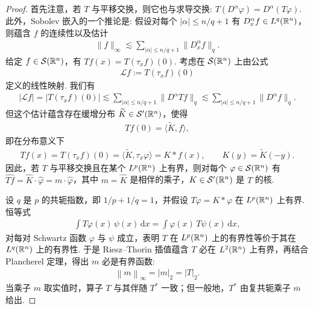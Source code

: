 \begin{proof}
首先注意，若 $T$ 与平移交换，则它也与求导交换: $T(D^\alpha \varphi) = D^\alpha(T \varphi)$. 此外，Sobolev 嵌入的一个推论是: 假设对每个 $|\alpha| \leq n/q + 1$ 有 $D_x^\alpha f \in L^q(\mathbb{R}^n)$，则蕴含 $f$ 的连续性以及估计
\begin{align*}
  \|f\|_{\infty}\lesssim\sum_{|\alpha|\leq n/q+1}\|D_{x}^{\alpha}f\|_{q}.
\end{align*}
给定 $f \in \mathcal{S}(\mathbb{R}^n)$，有 $Tf(x) = T(\tau_x f)(0)$. 考虑在 $\mathcal{S}(\mathbb{R}^n)$ 上由公式
\begin{align*}
  \mathcal{L}f:=T(\tau_{x}f)(0)
\end{align*}
定义的线性映射. 我们有
\begin{align*}
  |\mathcal{L}f|=|T(\tau_{x}f)(0)|\lesssim\sum_{|\alpha|\leq n/q+1}\|D^{\alpha}T f\|_{q}
  \lesssim\sum_{|\alpha|\leq n/q+1}\|D^{\alpha}f\|_{q}.
\end{align*}
但这个估计蕴含存在缓增分布 $\widetilde{K} \in \mathcal{S}'(\mathbb{R}^n)$，使得
\begin{align*}
  T f(0)=\langle\widetilde{K},f\rangle,
\end{align*}
即在分布意义下
\begin{align*}
  T f(x)=T(\tau_{x}f)(0)=\langle\widetilde{K},\tau_{x}\varphi\rangle=K*f(x),\qquad
  K(y)=\widetilde{K}(-y).
\end{align*}
因此，若 $T$ 与平移交换且在某个 $L^p(\mathbb{R}^n)$ 上有界，则对每个 $\varphi \in \mathcal{S}(\mathbb{R}^n)$ 有 $\widehat{Tf} = \widehat{K}\cdot\widehat{\varphi} = m\cdot\widehat{\varphi}$，其中 $m = \widehat{K}$ 是相伴的乘子，$K \in \mathcal{S}'(\mathbb{R}^n)$ 是 $T$ 的核.

设 $q$ 是 $p$ 的共轭指数，即 $1/p + 1/q = 1$，并假设 $T\varphi = K * \varphi$ 在 $L^p(\mathbb{R}^n)$ 上有界. 恒等式
\begin{align*}
  \int T\varphi(x)\,\psi(x)\,\mathrm{d}x=\int \varphi(x)\,T\psi(x)\,\mathrm{d}x,
\end{align*}
对每对 Schwartz 函数 $\varphi$ 与 $\psi$ 成立，表明 $T$ 在 $L^p(\mathbb{R}^n)$ 上的有界性等价于其在 $L^q(\mathbb{R}^n)$ 上的有界性. 于是 Riesz--Thorin 插值蕴含 $T$ 必在 $L^2(\mathbb{R}^n)$ 上有界，再结合 Plancherel 定理，得出 $m$ 必是有界函数:
\begin{align*}
  \left\|m\right\|_{\infty}=\left|m\right|_{2}=\left|T\right|_{2}.
\end{align*}
当乘子 $m$ 取实值时，算子 $T$ 与其伴随 $T^{*}$ 一致；但一般地，$T^{*}$ 由复共轭乘子 $\overline{m}$ 给出.
\end{proof}

